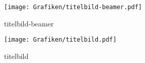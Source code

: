 %
%
\begin{figure}[!hb]%
    \centering
  \texttt{[image: Grafiken/titelbild-beamer.pdf]}%
  \caption{titelbild-beamer}%
\end{figure}

%
%
\begin{figure}[!hb]%
    \centering
  \texttt{[image: Grafiken/titelbild.pdf]}%
  \caption{titelbild}%
\end{figure}

